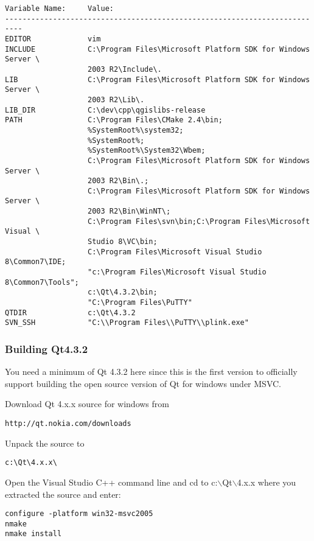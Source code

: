 \begin{verbatim}
Variable Name:     Value:
--------------------------------------------------------------------------
EDITOR             vim
INCLUDE            C:\Program Files\Microsoft Platform SDK for Windows Server \
                   2003 R2\Include\.
LIB                C:\Program Files\Microsoft Platform SDK for Windows Server \
                   2003 R2\Lib\.
LIB_DIR            C:\dev\cpp\qgislibs-release
PATH               C:\Program Files\CMake 2.4\bin;
                   %SystemRoot%\system32;
                   %SystemRoot%;
                   %SystemRoot%\System32\Wbem;
                   C:\Program Files\Microsoft Platform SDK for Windows Server \
                   2003 R2\Bin\.;
                   C:\Program Files\Microsoft Platform SDK for Windows Server \
                   2003 R2\Bin\WinNT\;
                   C:\Program Files\svn\bin;C:\Program Files\Microsoft Visual \
                   Studio 8\VC\bin;
                   C:\Program Files\Microsoft Visual Studio 8\Common7\IDE;
                   "c:\Program Files\Microsoft Visual Studio 8\Common7\Tools";
                   c:\Qt\4.3.2\bin;
                   "C:\Program Files\PuTTY"
QTDIR              c:\Qt\4.3.2
SVN_SSH            "C:\\Program Files\\PuTTY\\plink.exe"
\end{verbatim}

\subsubsection{Building Qt4.3.2}
You need a minimum of Qt 4.3.2 here since this is the first version to officially 
support building the open source version of Qt for windows under MSVC.

Download Qt 4.x.x source for windows from

\begin{verbatim}
http://qt.nokia.com/downloads
\end{verbatim}

Unpack the source to 

\begin{verbatim}
c:\Qt\4.x.x\
\end{verbatim}

\minisec{Compile Qt}
Open the Visual Studio C++ command line and cd to c:$\backslash$Qt$\backslash$4.x.x where you
extracted the source and enter:

\begin{verbatim}
configure -platform win32-msvc2005
nmake
nmake install
\end{verbatim}

